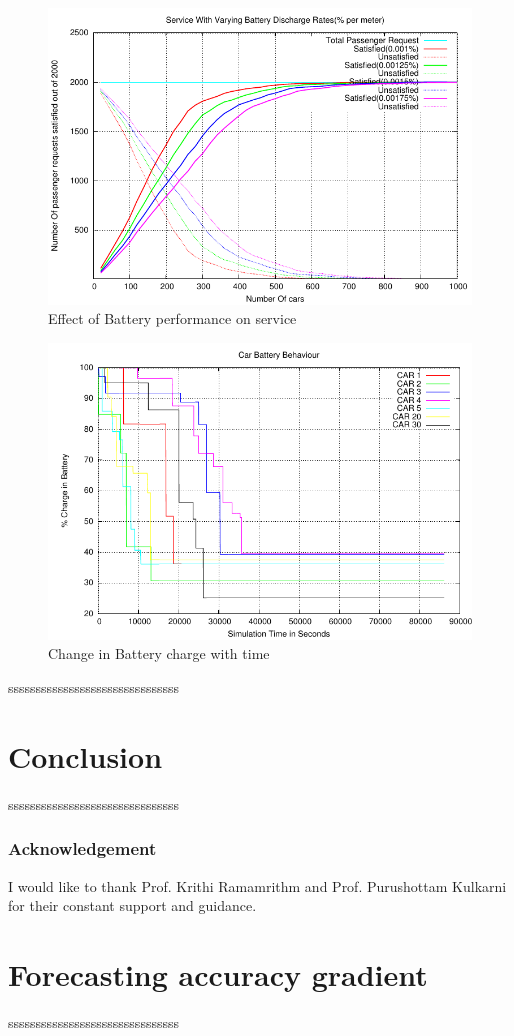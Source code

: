 \documentclass[11pt]{report}
\begin{document}
\begin{figure}[h!t]
\centering
\includegraphics[scale=0.9]{../plots/nCarVariation_old}
\caption{Effect of Battery performance on service}\label{fig:SVM}
\end{figure}

\begin{figure}[h!t]
\centering
\includegraphics[scale=0.9]{../plots/carsBatteryPower}
\caption{Change in Battery charge with time}\label{fig:SVM}
\end{figure}
\indent sssssssssssssssssssssssssssssss


\chapter{Conclusion}
 sssssssssssssssssssssssssssssss
\subsection*{Acknowledgement}
I would like to thank Prof. Krithi Ramamrithm and Prof. Purushottam Kulkarni for their constant support and guidance.%

\appendix
\chapter{Forecasting accuracy gradient}

sssssssssssssssssssssssssssssss




\end{document}
